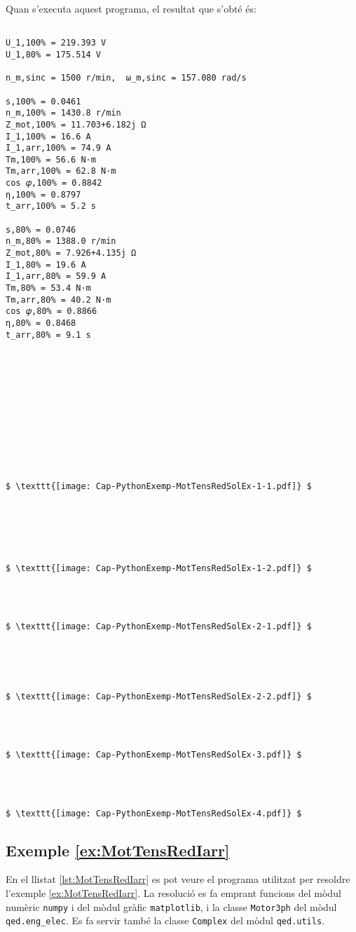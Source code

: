 Quan s'executa aquest programa, el resultat que s'obté és:
\lstset{
	language=,
	numbers=none,
	frame=none
}
\begin{lstlisting}[mathescape=true]
	
U_1,100% = 219.393 V
U_1,80% = 175.514 V

n_m,sinc = 1500 r/min,  ω_m,sinc = 157.080 rad/s

s,100% = 0.0461
n_m,100% = 1430.8 r/min
Z_mot,100% = 11.703+6.182j Ω
I_1,100% = 16.6 A
I_1,arr,100% = 74.9 A
Tm,100% = 56.6 N·m
Tm,arr,100% = 62.8 N·m
cos 𝜑,100% = 0.8842
η,100% = 0.8797
t_arr,100% = 5.2 s

s,80% = 0.0746
n_m,80% = 1388.0 r/min
Z_mot,80% = 7.926+4.135j Ω
I_1,80% = 19.6 A
I_1,arr,80% = 59.9 A
Tm,80% = 53.4 N·m
Tm,arr,80% = 40.2 N·m
cos 𝜑,80% = 0.8866
η,80% = 0.8468
t_arr,80% = 9.1 s












$ \texttt{[image: Cap-PythonExemp-MotTensRedSolEx-1-1.pdf]} $






$ \texttt{[image: Cap-PythonExemp-MotTensRedSolEx-1-2.pdf]} $




$ \texttt{[image: Cap-PythonExemp-MotTensRedSolEx-2-1.pdf]} $





$ \texttt{[image: Cap-PythonExemp-MotTensRedSolEx-2-2.pdf]} $




$ \texttt{[image: Cap-PythonExemp-MotTensRedSolEx-3.pdf]} $




$ \texttt{[image: Cap-PythonExemp-MotTensRedSolEx-4.pdf]} $
\end{lstlisting} 



\hypertarget{exemple:MotTensRedIarr}{\subsection{Exemple \ref*{ex:MotTensRedIarr} \MotTensRedIarr}}
En el llistat \vref{lst:MotTensRedIarr} es pot veure el programa utilitzat per resoldre l'exemple \vref{ex:MotTensRedIarr}. La resolució es fa emprant funcions del mòdul numèric \texttt{numpy} i del mòdul gràfic \texttt{matplotlib}, i la classe \texttt{Motor3ph} del mòdul \texttt{qed.eng\_elec}.  Es fa servir també la classe \texttt{Complex} del mòdul \texttt{qed.utils}.


